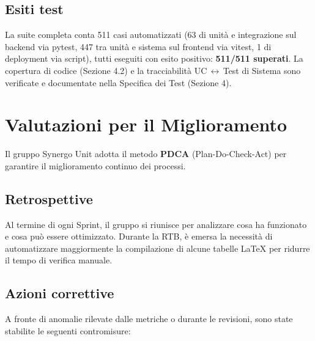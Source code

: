 \subsection{Esiti test}
La suite completa conta 511 casi automatizzati (63 di unità e integrazione sul backend via pytest, 447 tra unità e sistema sul frontend via vitest, 1 di deployment via script), tutti eseguiti con esito positivo: \textbf{511/511 superati}. La copertura di codice (Sezione 4.2) e la tracciabilità UC\,$\leftrightarrow$\,Test di Sistema sono verificate e documentate nella Specifica dei Test (Sezione 4).

\newpage
\section{Valutazioni per il Miglioramento}
Il gruppo Synergo Unit adotta il metodo \textbf{PDCA} (Plan-Do-Check-Act) per garantire il miglioramento continuo dei processi.

\subsection{Retrospettive}
Al termine di ogni Sprint, il gruppo si riunisce per analizzare cosa ha funzionato e cosa può essere ottimizzato. Durante la RTB, è emersa la necessità di automatizzare maggiormente la compilazione di alcune tabelle LaTeX per ridurre il tempo di verifica manuale.

\subsection{Azioni correttive}
A fronte di anomalie rilevate dalle metriche o durante le revisioni, sono state stabilite le seguenti contromisure:

